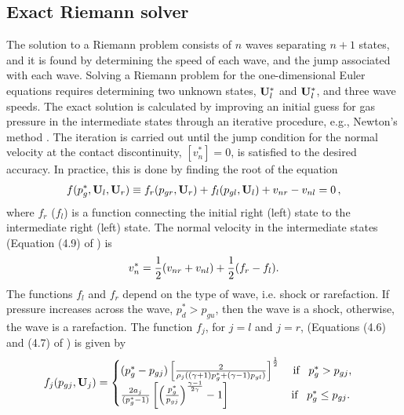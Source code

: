 \subsection[Exact Riemann solvers]{Exact Riemann solver}
\label{sec:hydro_exact_rsolvers}

The solution to a Riemann problem consists of $n$ waves separating $n+1$ states, and it is found by determining the speed of each wave, and the jump associated with each wave.  Solving a Riemann problem for the one-dimensional Euler equations requires determining two unknown states, $\mathbf{U}^*_l$ and $\mathbf{U}^*_l$, and three wave speeds.  The exact solution is calculated by improving an initial guess for gas pressure in the intermediate states through an iterative procedure, e.g., Newton's method \citep{Toro:1999}.  The iteration is carried out until the jump condition for the normal velocity at the contact discontinuity, $[v^*_n] = 0$, is satisfied to the desired accuracy.  In practice, this is done by finding the root of the equation
\begin{gather*}
f(p^*_g,\mathbf{U}_l,\mathbf{U}_r) \equiv f_r(p_{gr},\mathbf{U}_r) + f_l(p_{gl},\mathbf{U}_l) + v_{nr} - v_{nl} = 0 \, ,
\end{gather*}
where $f_r$ ($f_l$) is a function connecting the initial right (left) state to the intermediate right (left) state.  The normal velocity in the intermediate states (Equation (4.9) of \citep{Toro:1999}) is 
\begin{gather*}
v^*_n = \frac{1}{2} (v_{nr} + v_{nl}) + \frac{1}{2} (f_r - f_l).
\end{gather*}
The functions $f_l$ and $f_r$ depend on the type of wave, i.e. shock or rarefaction.  If pressure increases across the wave, $p^*_d > p_{gu}$, then the wave is a shock, otherwise, the wave is a rarefaction.  The function $f_j$, for $j=l$ and $j=r$, (Equations (4.6) and (4.7) of \citep{Toro:1999}) is given by
\begin{gather*}
f_j(p_{gj},\mathbf{U}_j) = 
\begin{cases}
(p^*_g - p_{gj})\left[ \frac{2}{\rho_j((\gamma +1)p^*_{g} + (\gamma -1)p_{gl})} \right]^{\frac{1}{2}} 
  \;\;\;\; \text{if}\;\;\; p^*_g > p_{gj}, \\
\frac{2a_j}{(p^*_g - 1)}\left[\left(\frac{p^*_g}{p_{gj}} \right)^{\frac{\gamma-1}{2\gamma}} - 1\right] 
  \;\;\;\;\;\;\;\;\;\;\;\;\;\;\;\;\;\;\;\; \text{if}\;\;\; p^*_g \le p_{gj}. \\
\end{cases}
\end{gather*}
